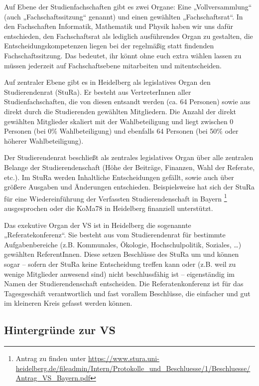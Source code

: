 Auf Ebene der Studienfachschaften gibt es zwei Organe: Eine „Vollversammlung“
(auch „Fachschaftssitzung“ genannt) und einen gewählten „Fachschaftsrat“. In
den Fachschaften Informatik, Mathematik und Physik haben wir uns dafür
entschieden, den Fachschaftsrat als lediglich ausführendes Organ zu gestalten,
die Entscheidungskompetenzen liegen bei der regelmäßig statt findenden
Fachschaftssitzung. Das bedeutet, ihr könnt ohne euch extra wählen lassen zu
müssen jederzeit auf Fachschaftsebene mitarbeiten und mitentscheiden.

Auf zentraler Ebene gibt es in Heidelberg als legislatives Organ den
Studierendenrat (StuRa). Er besteht aus VertreterInnen aller
Studienfachschaften, die von diesen entsandt werden (ca. 64 Personen) sowie aus
direkt durch die Studierenden gewählten Mitgliedern. Die Anzahl der direkt
gewählten Mitglieder skaliert mit der Wahlbeteiligung und liegt zwischen 0
Personen (bei 0\% Wahlbeteiligung) und ebenfalls 64 Personen (bei 50\% oder
höherer Wahlbeteiligung).

Der Studierendenrat beschließt als zentrales legislatives Organ über alle
zentralen Belange der Studierendenschaft (Höhe der Beiträge, Finanzen, Wahl der
Referate, etc.). Im StuRa werden Inhaltliche Entscheidungen gefällt, sowie auch
über größere Ausgaben und Änderungen entschieden. Beispielsweise hat sich der
StuRa für eine Wiedereinführung der Verfassten Studierendenschaft in Bayern
\footnote{Antrag zu finden unter
\url{https://www.stura.uni-heidelberg.de/fileadmin/Intern/Protokolle_und_Beschluesse/1/Beschluesse/Antrag_VS_Bayern.pdf}}
ausgesprochen oder die KoMa78 in Heidelberg finanziell unterstützt.


Das exekutive Organ der VS ist in Heidelberg die sogenannte
„Referatekonferenz“. Sie besteht aus vom Studierendenrat für bestimmte
Aufgabenbereiche (z.B. Kommunales, Ökologie, Hochschulpolitik, Soziales,
\dots) gewählten ReferentInnen. Diese setzen Beschlüsse des StuRa um und können
sogar -- sofern der StuRa keine Entscheidung treffen kann oder (z.B. weil zu
wenige Mitglieder anwesend sind) nicht beschlussfähig ist -- eigenständig im
Namen der Studierendenschaft entscheiden. Die Referatenkonferenz ist für das
Tagesgeschäft verantwortlich und fast vorallem Beschlüsse, die einfacher und
gut im kleineren Kreis gefasst werden können. 

\subsection{Hintergründe zur VS}


